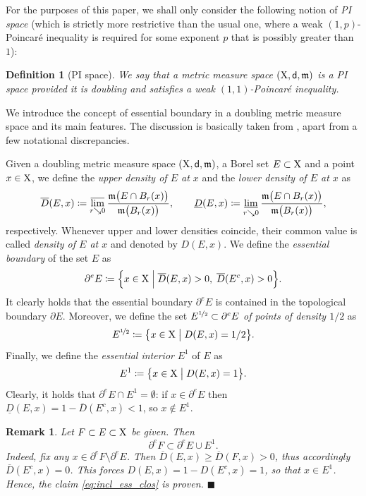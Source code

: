 \documentclass[reqno]{amsart}
\numberwithin{equation}{section}
\newcommand{\X}{{\rm X}}
\newcommand{\sfd}{{\sf d}}
\newcommand{\mm}{\mathfrak m}
\newcommand{\1}{\mathbbm 1}
\newcommand{\limi}{\varliminf}
\newcommand{\lims}{\varlimsup}
\newcommand{\fr}{\penalty-20\null\hfill\(\blacksquare\)}
\newtheorem{definition}[theorem]{Definition}
\newtheorem{remark}[theorem]{Remark}
\begin{document}
%
%
For the purposes of this paper, we shall only consider the following notion of
\emph{PI space} (which is strictly more restrictive than the usual one, where
a weak \((1,p)\)-Poincar\'{e} inequality is required for some exponent \(p\) that
is possibly greater than \(1\)):
%
%
\begin{definition}[PI space]
We say that a metric measure space \((\X,\sfd,\mm)\) is a \emph{PI space}
provided it is doubling and satisfies a weak \((1,1)\)-Poincar\'{e} inequality.
\end{definition}
%
%
We introduce the concept of essential boundary
in a doubling metric measure space and its main features. The
discussion is basically taken from \cite{Ambrosio01,Ambrosio02},
apart from a few notational discrepancies.
\medskip

Given a doubling metric measure space \((\X,\sfd,\mm)\), a
Borel set \(E\subset\X\) and a point \(x\in\X\), we define
the \emph{upper density of \(E\) at \(x\)} and the \emph{lower
density of \(E\) at \(x\)} as
\[
\overline D(E,x)\coloneqq\lims_{r\searrow 0}
\frac{\mm\big(E\cap B_r(x)\big)}{\mm\big(B_r(x)\big)},\qquad
\underline D(E,x)\coloneqq\limi_{r\searrow 0}
\frac{\mm\big(E\cap B_r(x)\big)}{\mm\big(B_r(x)\big)},
\]
respectively. Whenever upper and lower densities coincide, their common
value is called \emph{density of \(E\) at \(x\)} and denoted by \(D(E,x)\).
We define the \emph{essential boundary} of the set \(E\) as
\[
\partial^e E\coloneqq\Big\{x\in\X\;\Big|
\;\overline D(E,x)>0,\;\overline D(E^c,x)>0\Big\}.
\]
It clearly holds that the essential boundary \(\partial^e E\)
is contained in the topological boundary \(\partial E\). Moreover,
we define the set \(E^{\nicefrac{1}{2}}\subset\partial^e E\)
\emph{of points of density \(1/2\)} as
\[
E^{\nicefrac{1}{2}}\coloneqq\big\{x\in\X\;\big|\;D(E,x)=1/2\big\}.
\]
%
%
Finally, we define the \emph{essential interior} \(E^1\) of \(E\) as
\[
E^1\coloneqq\big\{x\in\X\;\big|\;D(E,x)=1\big\}.
\]
Clearly, it holds that \(\partial^e E\cap E^1=\emptyset\):
if \(x\in\partial^e E\) then \(\underline D(E,x)=1-\overline D(E^c,x)<1\),
so \(x\notin E^1\).
%
%
\begin{remark}{\rm
Let \(F\subset E\subset\X\) be given. Then
\begin{equation}\label{eq:incl_ess_clos}
\partial^e F\subset\partial^e E\cup E^1.
\end{equation}
Indeed, fix any \(x\in\partial^e F\setminus\partial^e E\). Then
\(\overline D(E,x)\geq\overline D(F,x)>0\), thus accordingly
\(\overline D(E^c,x)=0\). This forces \(D(E,x)=1-D(E^c,x)=1\),
so that \(x\in E^1\). Hence, the claim \eqref{eq:incl_ess_clos} is proven.
\fr}\end{remark}
\end{document}
